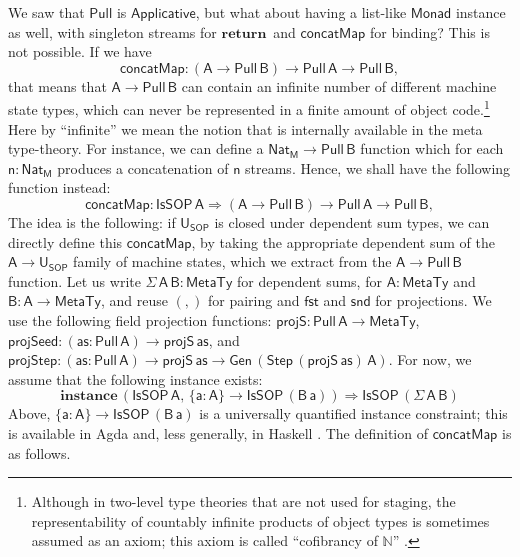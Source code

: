 \documentclass[acmsmall,screen,review,anonymous]{acmart}
\newcommand{\mit}[1]{{\mathsf{#1}}}
\newcommand{\msf}[1]{{\mathsf{#1}}}
\newcommand{\mbf}[1]{{\mathbf{#1}}}
\newcommand{\return}{\mbf{return}\,}
\newcommand{\M}{\msf{M}}
\newcommand{\vas}{\mathsf{as}}
\newcommand{\vn}{\mathsf{n}}
\newcommand{\vA}{\mathsf{A}}
\newcommand{\vB}{\mathsf{B}}
\newcommand{\va}{\mathsf{a}}
\newcommand{\USOP}{\msf{U}_{\msf{SOP}}}
\newcommand{\IsSOP}{\msf{IsSOP}}
\newcommand{\Monad}{\msf{Monad}}
\newcommand{\Applicative}{\msf{Applicative}}
\newcommand{\concatMap}{\msf{concatMap}}
\newcommand{\MTy}{\msf{MetaTy}}
\newcommand{\fst}{\msf{fst}}
\newcommand{\snd}{\msf{snd}}
\newcommand{\Nat}{\msf{Nat}}
\theoremstyle{remark}
\newcommand{\instance}{\mbf{instance}\,}
\newcommand{\Gen}{\msf{Gen}}
\newcommand{\RA}{\Rightarrow}
\newcommand{\Step}{\msf{Step}}
\newcommand{\Pull}{\msf{Pull}}
\begin{document}
We saw that $\Pull$ is $\Applicative$, but what about having a list-like
$\Monad$ instance as well, with singleton streams for $\return$ and $\concatMap$
for binding? This is not possible. If we have
\[ \concatMap : (\vA \to \Pull\,\vB) \to \Pull\,\vA \to \Pull\,\vB, \]
that means that $\vA \to \Pull\,\vB$ can contain an infinite number of different
machine state types, which can never be represented in a finite amount of object
code.\footnote{Although in two-level type theories that are not used for
staging, the representability of countably infinite products of object types is
sometimes assumed as an axiom; this axiom is called ``cofibrancy of
$\mathbb{N}$'' \cite{TODO}.} Here by ``infinite'' we mean the notion that is
internally available in the meta type-theory. For instance, we can define a
$\Nat_\M \to \Pull\,\vB$ function which for each $\vn : \Nat_\M$ produces a
concatenation of $\vn$ streams. Hence, we shall have the following function
instead:
\[ \concatMap : \IsSOP\,\vA \RA (\vA \to \Pull\,\vB) \to \Pull\,\vA \to \Pull\,\vB, \]
The idea is the following: if $\USOP$ is closed under dependent sum types, we
can directly define this $\concatMap$, by taking the appropriate dependent sum
of the $\vA \to \USOP$ family of machine states, which we extract from the $\vA
\to \Pull\,\vB$ function. Let us write $\Sigma\,\vA\,\vB : \MTy$ for dependent
sums, for $\vA : \MTy$ and $\vB : \vA \to \MTy$, and reuse $({,})$ for pairing
and $\fst$ and $\snd$ for projections. We use the following field projection functions:
$\mit{projS} : \Pull\,\vA \to \MTy$, $\mit{projSeed} : (\vas : \Pull\,\vA) \to
\mit{projS}\,\vas$, and $\mit{projStep} : (\vas : \Pull\,\vA) \to
\mit{projS}\,\vas \to \Gen\,(\Step\,(\mit{projS}\,\vas)\,\vA)$.
For now, we assume that the following instance exists:
\[ \instance (\IsSOP\,\vA,\,\{\va : \vA\} \to \IsSOP\,(\vB\,\va)) \RA \IsSOP\,(\Sigma\,\vA\,\vB) \]
Above, $\{\va : \vA\} \to \IsSOP\,(\vB\,\va)$ is a universally quantified
instance constraint; this is available in Agda and, less generally, in Haskell
\cite{TODO}. The definition of $\concatMap$ is as follows.
\end{document}
